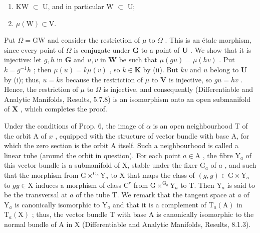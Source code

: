 \begin{enumerate}
\def\labelenumi{(\roman{enumi})}
\item
  KW \(\subset\) U, and in particular W \(\subset\) U;
\item
  \(\mu(\mathrm{W}) \subset \mathrm{V}.\)
\end{enumerate}

Put \(\Omega = \mathrm{GW}\) and consider the restriction of \(\mu\) to \(\Omega\) . This is an étale morphism, since every point of \(\Omega\) is conjugate under \(\mathbf{G}\) to a point of \(\mathbf{U}\) . We show that it is injective: let \(g, h\) in \(\mathbf{G}\) and \(u, v\) in \(\mathbf{W}\) be such that \(\mu(gu) = \mu(hv)\) . Put \(k = g^{-1}h\) ; then \(\mu(u) = k\mu(v)\) , so \(k \in \mathbf{K}\) by (ii). But \(kv\) and \(u\) belong to \(\mathbf{U}\) by (i); thus, \(u = kv\) because the restriction of \(\mu\) to \(\mathbf{V}\) is injective, so \(gu = hv\) . Hence, the restriction of \(\mu\) to \(\Omega\) is injective, and consequently (Differentiable and Analytic Manifolds, Results, 5.7.8) is an isomorphism onto an open submanifold of \(\mathbf{X}\) , which completes the proof.

Under the conditions of Prop. 6, the image of \(\alpha\) is an open neighbourhood T of the orbit A of \(x\) , equipped with the structure of vector bundle with base A, for which the zero section is the orbit A itself. Such a neighbourhood is called a linear tube (around the orbit in question). For each point \(a \in \mathrm{A}\) , the fibre \(\mathrm{Y}_a\) of this vector bundle is a submanifold of X, stable under the fixer \(\mathrm{G}_a\) of \(a\) , and such that the morphism from \(\mathrm{G} \times^{\mathrm{G}_a}\mathrm{Y}_a\) to X that maps the class of \((g,y) \in \mathrm{G} \times \mathrm{Y}_a\) to \(gy \in \mathrm{X}\) induces a morphism of class \(\mathrm{C}^r\) from \(\mathrm{G} \times^{\mathrm{G}_a}\mathrm{Y}_a\) to T. Then \(\mathrm{Y}_a\) is said to be the transversal at \(a\) of the tube T. We remark that the tangent space at \(a\) of \(\mathrm{Y}_a\) is canonically isomorphic to \(\mathrm{Y}_a\) and that it is a complement of \(\mathrm{T}_a(\mathrm{A})\) in \(\mathrm{T}_a(\mathrm{X})\) ; thus, the vector bundle T with base A is canonically isomorphic to the normal bundle of A in X (Differentiable and Analytic Manifolds, Results, 8.1.3).


